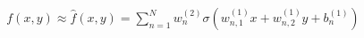 \documentclass[preview]{standalone}
\begin{document}
\begin{align*}
f(x,y) \approx \hat{f}(x,y) =  \sum_{n=1}^{N} w_n^{(2)} \sigma(w_{n,1}^{(1)}x + w_{n,2}^{(1)}y +b_n^{(1)})
\end{align*}
\end{document}
